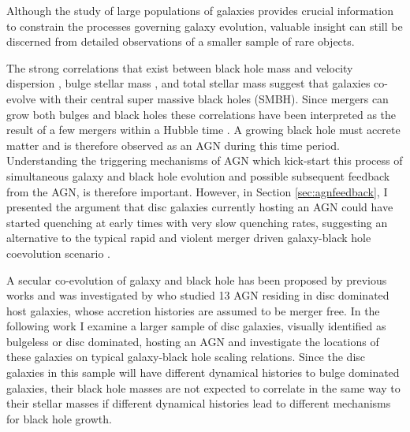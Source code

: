 
Although the study of large populations of galaxies provides crucial information to constrain the processes governing galaxy evolution, valuable insight can still be discerned from detailed observations of a smaller sample of rare objects. 

The strong correlations that exist between black hole mass and velocity dispersion \citep{magorrian98, merritt01, hu08, kormendy11a, mcconnell11}, bulge stellar mass \citep{marconi03, haringrix04}, and total stellar mass \citep{cisternas11} suggest that galaxies co-evolve with their central super massive black holes (SMBH). Since mergers can grow both bulges and black holes these correlations have been interpreted as the result of a few mergers within a Hubble time \citep{peng07, hopkins08a, jahnke11}. A growing black hole must accrete matter and is therefore observed as an AGN during this time period. Understanding the triggering mechanisms of AGN which kick-start this process of simultaneous galaxy and black hole evolution and possible subsequent feedback from the AGN, is therefore important. However, in Section \ref{sec:agnfeedback}, I presented the argument that disc galaxies currently hosting an AGN could have started quenching at early times with very slow quenching rates, suggesting an alternative to the typical rapid and violent merger driven galaxy-black hole coevolution scenario \citep{hopkins08a}. 

A secular co-evolution of galaxy and black hole has been proposed by previous works \citep{greene10b, jiang11b, cisternas11, Simmons11,schawinski11, kocevski12} and was investigated by \citet{Simmons13} who studied 13 AGN residing in disc dominated host galaxies, whose accretion histories are assumed to be merger free. In the following work I examine a larger sample of disc galaxies, visually identified as bulgeless or disc dominated, hosting an AGN and investigate the locations of these galaxies on typical galaxy-black hole scaling relations. Since the disc galaxies in this sample will have different dynamical histories to bulge dominated galaxies, their black hole masses are not expected to correlate in the same way to their stellar masses if different dynamical histories lead to different mechanisms for black hole growth. 



